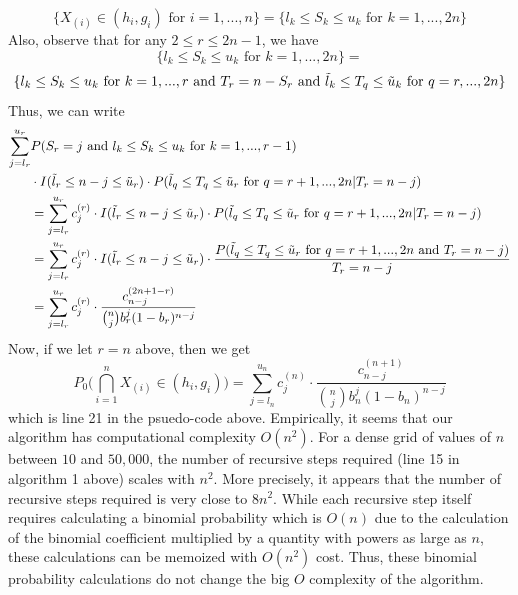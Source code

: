 \documentclass[article]{jss}
\begin{document}
%
\begin{equation*}
    \{X_{(i)} \in (h_{i}, g_{i}) \textrm{ for } i = 1,..., n\} = \{l_{k} \leq S_{k} \leq u_{k} \textrm{ for } k = 1, ..., 2n\}
\end{equation*}
%
Also, observe that for any $2 \leq r \leq 2n - 1$, we have
%
\begin{equation*}
    \{l_{k} \leq S_{k} \leq u_{k} \textrm{ for } k = 1, ..., 2n\} = 
\end{equation*}
%
\begin{equation*}
    \{l_{k} \leq S_{k} \leq u_{k} \textrm{ for } k = 1, ..., r \textrm{ and } T_{r} = n - S_{r} \textrm{ and } \Tilde{l}_{k} \leq T_{q} \leq \Tilde{u}_{k} \textrm{ for } q = r, ..., 2n\}
\end{equation*}
%
Thus, we can write 
%
\begin{align*}
    \sum_{j = l_{r}}^{u_{r}} &P(S_{r} = j \textrm{ and } l_{k} \leq S_{k} \leq u_{k} \textrm{ for } k = 1, ..., r - 1)\\
    &\cdot I(\Tilde{l}_{r} \leq n - j \leq \Tilde{u}_{r})
    \cdot P(\Tilde{l}_{q} \leq T_{q} \leq \Tilde{u}_{r} \textrm{ for } q = r + 1,..., 2n | T_{r} = n - j)\\
    &= \sum_{j = l_{r}}^{u_{r}} c_{j}^{(r)} \cdot I(\Tilde{l}_{r} \leq n - j \leq \Tilde{u}_{r}) \cdot P(\Tilde{l}_{q} \leq T_{q} \leq \Tilde{u}_{r} \textrm{ for } q = r + 1,..., 2n | T_{r} = n - j) \\
    &= \sum_{j = l_{r}}^{u_{r}} c_{j}^{(r)} \cdot I(\Tilde{l}_{r} \leq n - j \leq \Tilde{u}_{r}) \cdot \frac{P(\Tilde{l}_{q} \leq T_{q} \leq \Tilde{u}_{r} \textrm{ for } q = r + 1,..., 2n \textrm{ and } T_{r} = n - j)}{T_{r} = n - j} \\
    &= \sum_{j = l_{r}}^{u_{r}} c_{j}^{(r)} \cdot \frac{c_{n - j}^{(2n + 1 - r)}}{\binom{n}{j}b_{r}^{j}(1 - b_{r})^{n-j}}
\end{align*}
%
Now, if we let $r = n$ above, then we get 
%
\begin{equation*}
    P_{0}\Big(\bigcap\limits_{i=1}^{n} X_{(i)} \in (h_{i}, g_{i})\Big) = \sum_{j = l_{n}}^{u_{n}} c_{j}^{(n)} \cdot \frac{c_{n - j}^{(n + 1)}}{\binom{n}{j}b_{n}^{j}(1 - b_{n})^{n-j}}
\end{equation*}
%
which is line 21 in the psuedo-code above.
\newline
\newline
Empirically, it seems that our algorithm has computational complexity $O(n^{2})$. For a dense grid of values of $n$ between $10$ and $50,000$, the number of recursive steps required (line 15 in algorithm 1 above) scales with $n^{2}$. More precisely, it appears that the number of recursive steps required is very close to $8n^{2}$. While each recursive step itself requires calculating a binomial probability which is $O(n)$ due to the calculation of the binomial coefficient multiplied by a quantity with powers as large as $n$, these calculations can be memoized with $O(n^{2})$ cost. Thus, these binomial probability calculations do not change the big $O$ complexity of the algorithm.
\end{document}
